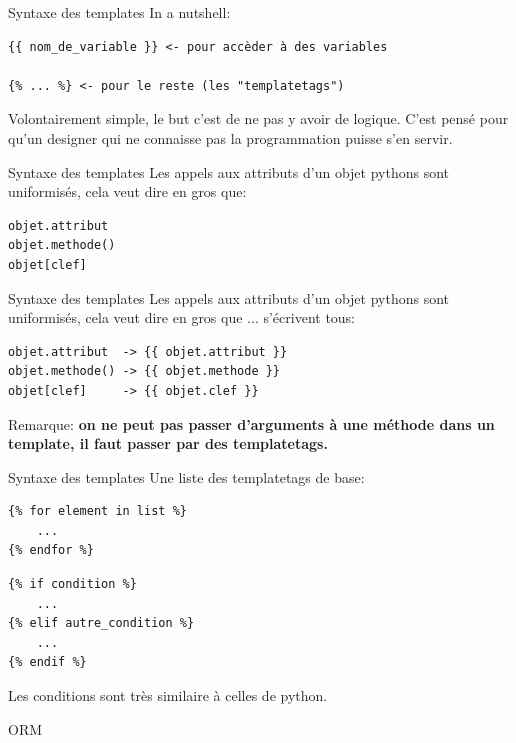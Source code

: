 \documentclass{beamer}
\begin{document}
\begin{frame}[fragile]{Syntaxe des templates}
    In a nutshell:

\begin{verbatim}
{{ nom_de_variable }} <- pour accèder à des variables

{% ... %} <- pour le reste (les "templatetags")
\end{verbatim}

Volontairement simple, le but c'est de ne pas y avoir de logique. C'est pensé pour qu'un designer qui ne connaisse pas la programmation puisse s'en servir.
\end{frame}

\begin{frame}[fragile]{Syntaxe des templates}
Les appels aux attributs d'un objet pythons sont uniformisés, cela veut dire en gros que:
\begin{verbatim}
objet.attribut
objet.methode()
objet[clef]
\end{verbatim}
\vspace{10mm}
\end{frame}

\begin{frame}[fragile]{Syntaxe des templates}
Les appels aux attributs d'un objet pythons sont uniformisés, cela veut dire en gros que ... s'écrivent tous:
\begin{verbatim}
objet.attribut  -> {{ objet.attribut }}
objet.methode() -> {{ objet.methode }}
objet[clef]     -> {{ objet.clef }}
\end{verbatim}
\pause
Remarque: \bf on ne peut pas passer d'arguments à une méthode dans un template, il faut passer par des templatetags.
\end{frame}

\begin{frame}[fragile]{Syntaxe des templates}
    Une liste des templatetags de base:\pause
\begin{verbatim}
{% for element in list %}
    ...
{% endfor %}
\end{verbatim}
\pause
\begin{verbatim}
{% if condition %}
    ...
{% elif autre_condition %}
    ...
{% endif %}
\end{verbatim}
Les conditions sont très similaire à celles de python.
\end{frame}

\begin{frame}[fragile]{}
\begin{LARGE}
\begin{center}
ORM
\end{center}
\end{LARGE}
\end{frame}
\end{document}
